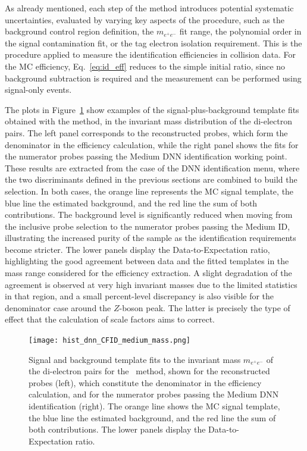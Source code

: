 As already mentioned, each step of the method introduces potential systematic uncertainties, evaluated by varying key aspects of the procedure, such as the background control region definition, the $m_{e^+e^-}$ fit range, the polynomial order in the signal contamination fit, or the tag electron isolation requirement. 
This is the procedure applied to measure the identification efficiencies in collision data. For the MC efficiency, Eq.~\ref{eq:id_eff} reduces to the simple initial ratio, since no background subtraction is required and the measurement can be performed using signal-only events.

The plots in Figure~\ref{fig:zmass_fit_dnn_medium} show examples of the signal-plus-background template fits obtained with the \zmass method, in the invariant mass distribution of the di-electron pairs. The left panel corresponds to the reconstructed probes, which form the denominator in the efficiency calculation, while the right panel shows the fits for the numerator probes passing the Medium DNN identification working point. These results are extracted from the case of the DNN identification menu, where the two discriminants defined in the previous sections are combined to build the selection. In both cases, the orange line represents the MC signal template, the blue line the estimated background, and the red line the sum of both contributions. The background level is significantly reduced when moving from the inclusive probe selection to the numerator probes passing the Medium ID, illustrating the increased purity of the sample as the identification requirements become stricter. 
The lower panels display the Data-to-Expectation ratio, highlighting the good agreement between data and the fitted templates in the mass range considered for the efficiency extraction. A slight degradation of the agreement is observed at very high invariant masses due to the limited statistics in that region, and a small percent-level discrepancy is also visible for the denominator case around the $Z$-boson peak. The latter is precisely the type of effect that the calculation of scale factors aims to correct.

\begin{figure}[htbp]
  \centering
  \texttt{[image: hist\_dnn\_CFID\_medium\_mass.png]}
  \caption{
    Signal and background template fits to the invariant mass $m_{e^{+}e^{-}}$ of the di-electron pairs for the \zmass\ method, shown for the reconstructed probes (left), which constitute the denominator in the efficiency calculation, and for the numerator probes passing the Medium DNN identification (right). The orange line shows the MC signal template, the blue line the estimated background, and the red line the sum of both contributions. The lower panels display the Data-to-Expectation ratio.}
  \label{fig:zmass_fit_dnn_medium}
\end{figure}


